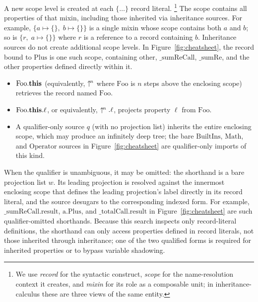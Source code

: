 A new scope level is created at each $\{\ldots\}$ record literal.%
\footnote{
  We use \emph{record} for the syntactic construct, \emph{scope}
  for the name-resolution context it creates, and \emph{mixin} for its
  role as a composable unit; in inheritance-calculus these are three views
  of the same entity.
}
The scope contains all properties of that mixin, including those
inherited via inheritance sources.
For example, $\{a \mapsto \{\},\; b \mapsto \{\}\}$ is a single mixin whose scope
contains both $a$ and $b$; so is $\{r,\; a \mapsto \{\}\}$ where $r$
is a reference to a record containing $b$.
Inheritance sources do not create additional scope levels.
In Figure~\ref{fig:cheatsheet}, the record bound to $\mathrm{Plus}$ is
one such scope, containing $\mathrm{other}$, $\mathrm{\_sumReCall}$,
$\mathrm{\_sumRe}$, and the other properties defined directly within it.

\begin{itemize}
  \item $\mathrm{Foo}.\mathbf{this}$ (equivalently, $\uparrow^{\!n}$ where
    $\mathrm{Foo}$ is $n$ steps above the enclosing scope)
    retrieves the record named $\mathrm{Foo}$.
  \item $\mathrm{Foo}.\mathbf{this}.\ell$, or equivalently, $\uparrow^{\!n}.\ell$,
    projects property $\ell$ from $\mathrm{Foo}$.
  \item A qualifier-only source $q$ (with no projection list) inherits
    the entire enclosing scope, which may produce an infinitely deep
    tree; the bare $\mathrm{BuiltIns}$, $\mathrm{Math}$, and
    $\mathrm{Operator}$ sources in Figure~\ref{fig:cheatsheet} are
    qualifier-only imports of this kind.
\end{itemize}

When the qualifier is unambiguous, it may be omitted: the shorthand is
a bare projection list $w$. Its leading projection is resolved against
the innermost enclosing scope that defines the leading projection's
label directly in its record literal, and the source desugars to the
corresponding indexed form.
For example, $\mathrm{\_sumReCall}.\mathrm{result}$,
$\mathrm{a}.\mathrm{Plus}$, and $\mathrm{\_totalCall}.\mathrm{result}$
in Figure~\ref{fig:cheatsheet} are such qualifier-omitted shorthands.
Because this search inspects only record-literal definitions, the
shorthand can only access properties defined in record literals, not
those inherited through inheritance; one of the two qualified forms is
required for inherited properties or to bypass variable shadowing.

